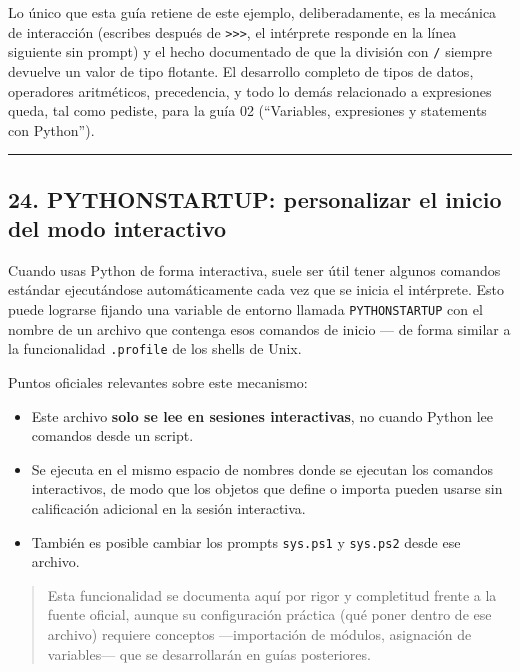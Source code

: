 \documentclass[
  doc,
  floatsintext,
  longtable,
  a4paper,
  nolmodern,
  notxfonts,
  notimes,
  12pt,
  colorlinks=true,linkcolor=blue,citecolor=blue,urlcolor=blue]{apa7}
\providecommand{\tightlist}{%
  \setlength{\itemsep}{0pt}\setlength{\parskip}{0pt}}
\begin{document}
Lo único que esta guía retiene de este ejemplo, deliberadamente, es la
mecánica de interacción (escribes después de
\texttt{\textgreater{}\textgreater{}\textgreater{}}, el intérprete
responde en la línea siguiente sin prompt) y el hecho documentado de que
la división con \texttt{/} siempre devuelve un valor de tipo flotante.
El desarrollo completo de tipos de datos, operadores aritméticos,
precedencia, y todo lo demás relacionado a expresiones queda, tal como
pediste, para la guía 02 (``Variables, expresiones y statements con
Python'').

\begin{center}\rule{0.5\linewidth}{0.5pt}\end{center}

\subsection{24. PYTHONSTARTUP: personalizar el inicio del modo
interactivo}\label{pythonstartup-personalizar-el-inicio-del-modo-interactivo}

Cuando usas Python de forma interactiva, suele ser útil tener algunos
comandos estándar ejecutándose automáticamente cada vez que se inicia el
intérprete. Esto puede lograrse fijando una variable de entorno llamada
\texttt{PYTHONSTARTUP} con el nombre de un archivo que contenga esos
comandos de inicio --- de forma similar a la funcionalidad
\texttt{.profile} de los shells de Unix.

Puntos oficiales relevantes sobre este mecanismo:

\begin{itemize}
\tightlist
\item
  Este archivo \textbf{solo se lee en sesiones interactivas}, no cuando
  Python lee comandos desde un script.
\item
  Se ejecuta en el mismo espacio de nombres donde se ejecutan los
  comandos interactivos, de modo que los objetos que define o importa
  pueden usarse sin calificación adicional en la sesión interactiva.
\item
  También es posible cambiar los prompts \texttt{sys.ps1} y
  \texttt{sys.ps2} desde ese archivo.
\end{itemize}

\begin{quote}
Esta funcionalidad se documenta aquí por rigor y completitud frente a la
fuente oficial, aunque su configuración práctica (qué poner dentro de
ese archivo) requiere conceptos ---importación de módulos, asignación de
variables--- que se desarrollarán en guías posteriores.
\end{quote}
\end{document}
